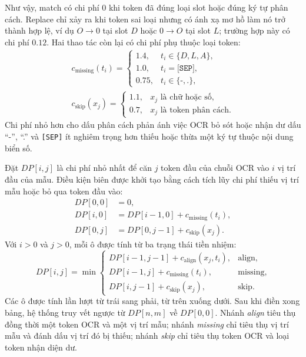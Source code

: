 \documentclass[../DoAn.tex]{subfiles}
\begin{document}
Như vậy, match có chi phí $0$ khi token đã đúng loại slot hoặc đúng ký tự
phân cách. Replace chỉ xảy ra khi token sai loại nhưng có ánh xạ mơ hồ làm nó
trở thành hợp lệ, ví dụ $O\rightarrow0$ tại slot $D$ hoặc $0\rightarrow O$
tại slot $L$; trường hợp này có chi phí $0.12$. Hai thao tác còn lại có chi
phí phụ thuộc loại token:
\begin{equation}
\begin{aligned}
c_{\mathrm{missing}}(t_i)=
\begin{cases}
1.4, & t_i\in\{D,L,A\},\\
1.0, & t_i=\texttt{[SEP]},\\
0.75, & t_i\in\{\texttt{-},\texttt{.}\},
\end{cases}\\[0.5em]
c_{\mathrm{skip}}(x_j)=
\begin{cases}
1.1, & x_j\text{ là chữ hoặc số},\\
0.7, & x_j\text{ là token phân cách}.
\end{cases}
\end{aligned}
\end{equation}
Chi phí nhỏ hơn cho dấu phân cách phản ánh việc OCR bỏ sót hoặc nhận dư dấu
``-'', ``.'' và \texttt{[SEP]} ít nghiêm trọng hơn thiếu hoặc thừa một ký tự
thuộc nội dung biển số.

Đặt $DP[i,j]$ là chi phí nhỏ nhất để căn $j$ token đầu của chuỗi OCR vào $i$
vị trí đầu của mẫu. Điều kiện biên được khởi tạo bằng cách tích lũy chi phí
thiếu vị trí mẫu hoặc bỏ qua token đầu vào:
\begin{equation}
\begin{aligned}
DP[0,0]&=0,\\
DP[i,0]&=DP[i-1,0]+c_{\mathrm{missing}}(t_i),\\
DP[0,j]&=DP[0,j-1]+c_{\mathrm{skip}}(x_j).
\end{aligned}
\end{equation}
Với $i>0$ và $j>0$, mỗi ô được tính từ ba trạng thái tiền nhiệm:
\begin{equation}
DP[i,j]=\min
\begin{cases}
DP[i-1,j-1]+c_{\mathrm{align}}(x_j,t_i), & \text{align},\\
DP[i-1,j]+c_{\mathrm{missing}}(t_i), & \text{missing},\\
DP[i,j-1]+c_{\mathrm{skip}}(x_j), & \text{skip}.
\end{cases}
\end{equation}
Các ô được tính lần lượt từ trái sang phải, từ trên xuống dưới. Sau khi điền
xong bảng, hệ thống truy vết ngược từ $DP[n,m]$ về $DP[0,0]$. Nhánh
\textit{align} tiêu thụ đồng thời một token OCR và một vị trí mẫu; nhánh
\textit{missing} chỉ tiêu thụ vị trí mẫu và đánh dấu vị trí đó bị thiếu;
nhánh \textit{skip} chỉ tiêu thụ token OCR và loại token nhận diện dư.
\end{document}
